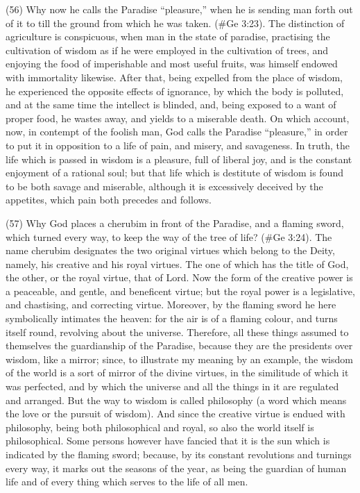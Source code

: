 (56) Why now he calls the Paradise ``pleasure,'' when he is sending man forth out of it to till the
ground from which he was taken. (\#Ge 3:23). The distinction of agriculture is conspicuous,
when man in the state of paradise, practising the cultivation of wisdom as if he were employed in
the cultivation of trees, and enjoying the food of imperishable and most useful fruits, was himself
endowed with immortality likewise. After that, being expelled from the place of wisdom, he
experienced the opposite effects of ignorance, by which the body is polluted, and at the same time
the intellect is blinded, and, being exposed to a want of proper food, he wastes away, and yields to
a miserable death. On which account, now, in contempt of the foolish man, God calls the Paradise
``pleasure,'' in order to put it in opposition to a life of pain, and misery, and savageness. In truth, the
life which is passed in wisdom is a pleasure, full of liberal joy, and is the constant enjoyment of a
rational soul; but that life which is destitute of wisdom is found to be both savage and miserable,
although it is excessively deceived by the appetites, which pain both precedes and follows.

(57) Why God places a cherubim in front of the Paradise, and a flaming sword, which turned every
way, to keep the way of the tree of life? (\#Ge 3:24). The name cherubim designates the two
original virtues which belong to the Deity, namely, his creative and his royal virtues. The one of
which has the title of God, the other, or the royal virtue, that of Lord. Now the form of the creative
power is a peaceable, and gentle, and beneficent virtue; but the royal power is a legislative, and
chastising, and correcting virtue. Moreover, by the flaming sword he here symbolically intimates the
heaven: for the air is of a flaming colour, and turns itself round, revolving about the universe.
Therefore, all these things assumed to themselves the guardianship of the Paradise, because they
are the presidents over wisdom, like a mirror; since, to illustrate my meaning by an example, the
wisdom of the world is a sort of mirror of the divine virtues, in the similitude of which it was
perfected, and by which the universe and all the things in it are regulated and arranged. But the way
to wisdom is called philosophy (a word which means the love or the pursuit of wisdom). And since
the creative virtue is endued with philosophy, being both philosophical and royal, so also the world
itself is philosophical. Some persons however have fancied that it is the sun which is indicated by
the flaming sword; because, by its constant revolutions and turnings every way, it marks out the
seasons of the year, as being the guardian of human life and of every thing which serves to the life
of all men.

